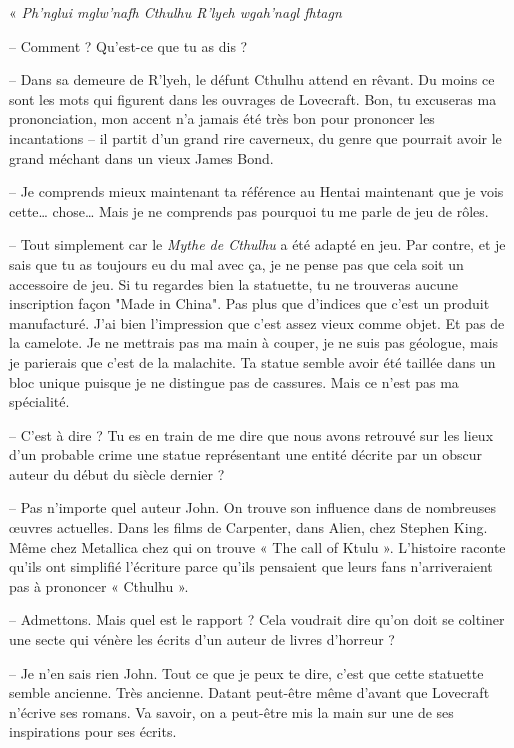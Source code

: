 « \emph{Ph’nglui mglw’nafh Cthulhu R’lyeh wgah’nagl fhtagn}

-- Comment ? Qu'est-ce que tu as dis ?

-- Dans sa demeure de R'lyeh, le défunt Cthulhu attend en rêvant. Du moins ce sont les mots qui figurent dans les
ouvrages de Lovecraft. Bon, tu excuseras ma prononciation, mon accent n'a jamais été très bon pour prononcer les
incantations -- il partit d'un grand rire caverneux, du genre que pourrait avoir le grand méchant dans un vieux James 
Bond.

-- Je comprends mieux maintenant ta référence au Hentai maintenant que je vois cette\ldots{} chose\ldots{} Mais je ne
comprends pas pourquoi tu me parle de jeu de rôles.

-- Tout simplement car le \emph{Mythe de Cthulhu} a été adapté en jeu. Par contre, et je sais que tu as toujours eu du 
mal avec ça, je ne pense pas que cela soit un accessoire de jeu. Si tu regardes bien la statuette, tu ne trouveras 
aucune inscription façon "Made in China". Pas plus que d'indices que c'est un produit manufacturé. J'ai bien 
l'impression que c'est assez vieux comme objet. Et pas de la camelote. Je ne mettrais pas ma main à couper, je ne 
suis pas géologue, mais je parierais que c'est de la malachite. Ta statue semble avoir été taillée dans un bloc unique 
puisque je ne distingue pas de cassures. Mais ce n'est pas ma spécialité.

-- C'est à dire ? Tu es en train de me dire que nous avons retrouvé sur les lieux d'un probable crime une statue 
représentant une entité décrite par un obscur auteur du début du siècle dernier ?

-- Pas n'importe quel auteur John. On trouve son influence dans de nombreuses œuvres actuelles. Dans les films de Carpenter, 
dans Alien, chez Stephen King. Même chez Metallica chez qui on trouve « The call of Ktulu ». L'histoire raconte qu'ils 
ont simplifié l'écriture parce qu'ils pensaient que leurs fans n'arriveraient pas à prononcer « Cthulhu ».

-- Admettons. Mais quel est le rapport ? Cela voudrait dire qu'on doit se coltiner une secte qui vénère les écrits d'un 
auteur de livres d'horreur ?

-- Je n'en sais rien John. Tout ce que je peux te dire, c'est que cette statuette semble ancienne. Très ancienne. Datant 
peut-être même d'avant que Lovecraft n'écrive ses romans. Va savoir, on a peut-être mis la main sur une de ses 
inspirations pour ses écrits.

